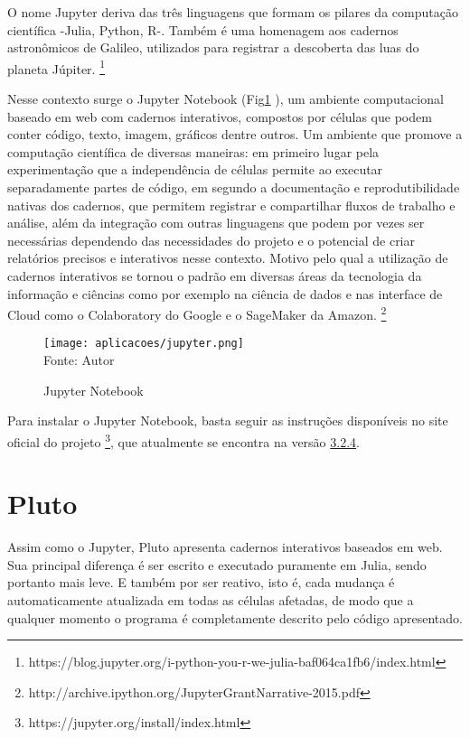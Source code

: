 O nome Jupyter deriva das três linguagens que formam os pilares da computação científica -Julia, Python, R-. Também é uma homenagem aos cadernos astronômicos de Galileo, utilizados para registrar a descoberta das luas do planeta Júpiter. \footnote{https://blog.jupyter.org/i-python-you-r-we-julia-baf064ca1fb6/index.html}

Nesse contexto surge o Jupyter Notebook (Fig\ref{jupyter} ), um ambiente computacional baseado em web com cadernos interativos, compostos por células que podem conter código, texto, imagem, gráficos dentre outros. Um ambiente que promove a computação científica de diversas maneiras: em primeiro lugar pela experimentação que a independência de células permite ao executar separadamente partes de código, em segundo a documentação e reprodutibilidade nativas dos cadernos, que permitem registrar e compartilhar fluxos de trabalho e análise, além da integração com outras linguagens que podem por vezes ser necessárias dependendo das necessidades do projeto e o potencial de criar relatórios precisos e interativos nesse contexto. Motivo pelo qual a utilização de cadernos interativos se tornou o padrão em diversas áreas da tecnologia da informação e ciências como por exemplo na ciência de dados e nas interface de Cloud como o Colaboratory do Google e o SageMaker da Amazon. \footnote{http://archive.ipython.org/JupyterGrantNarrative-2015.pdf}

\begin{figure}[H]
\begin{center}
    \caption{Jupyter Notebook} \label{jupyter}
    \texttt{[image: aplicacoes/jupyter.png]} \\
    {\tiny \sf Fonte: Autor}
\end{center}
\end{figure} 



Para instalar o Jupyter Notebook, basta seguir as instruções disponíveis no site oficial do projeto \footnote{https://jupyter.org/install/index.html}, que atualmente se encontra na versão \href{https://github.com/jupyterlab/jupyterlab/releases/tag/v3.2.4}{3.2.4}.

\section{Pluto}
Assim como o Jupyter, Pluto apresenta cadernos interativos baseados em web. 
Sua principal diferença é ser escrito e executado puramente em Julia, sendo portanto mais leve. E também por ser reativo, isto é, cada mudança é automaticamente atualizada em todas as células afetadas, de modo que a qualquer momento o programa é completamente descrito pelo código apresentado. 

